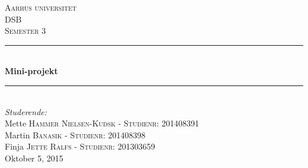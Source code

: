 \documentclass[12pt, letterpaper]{article}
\begin{document}
\begin{titlepage}

\newcommand{\HRule}{\rule{\linewidth}{0.5mm}} %

\center %
 

\textsc{\LARGE Aarhus universitet}\\[1.5cm] %
\textsc{\Large DSB}\\[0.5cm] %
\textsc{\large Semester 3}\\[0.5cm] %


\HRule \\[0.4cm]
{ \huge \bfseries Mini-projekt}\\[0.4cm] %
\HRule \\[1.5cm]
 

\Large \emph{Studerende:}\\[1cm]
Mette \textsc{Hammer Nielsen-Kudsk - Studienr: 201408391}\\[0,5cm] %
Martin \textsc{Banasik - Studienr: 201408398}\\[0,5cm] %
Finja \textsc{Jette Ralfs - Studienr: 201303659}\\[0,5cm] %

{\large Oktober 5, 2015}\\[1,2cm] %


\end{titlepage}
\end{document}
